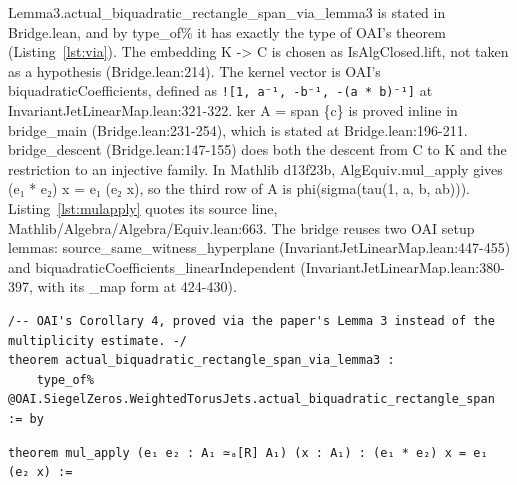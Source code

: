 Lemma3.actual\_biquadratic\_rectangle\_span\_via\_lemma3 is stated in Bridge.lean, and by type\_of\% it has exactly the type of OAI's theorem (Listing~\ref{lst:via}). %
The embedding K -> C is chosen as IsAlgClosed.lift, not taken as a hypothesis (Bridge.lean:214). %
The kernel vector is OAI's biquadraticCoefficients, defined as \texttt{![1, a⁻¹, -b⁻¹, -(a * b)⁻¹]} at InvariantJetLinearMap.lean:321-322. %
ker A = span \{c\} is proved inline in bridge\_main (Bridge.lean:231-254), which is stated at Bridge.lean:196-211. %
bridge\_descent (Bridge.lean:147-155) does both the descent from C to K and the restriction to an injective family. %
In Mathlib d13f23b, AlgEquiv.mul\_apply gives (e₁ * e₂) x = e₁ (e₂ x), so the third row of A is phi(sigma(tau(1, a, b, ab))). %
Listing~\ref{lst:mulapply} quotes its source line, Mathlib/Algebra/Algebra/Equiv.lean:663. %
The bridge reuses two OAI setup lemmas: source\_same\_witness\_hyperplane (InvariantJetLinearMap.lean:447-455) and biquadraticCoefficients\_linearIndependent (InvariantJetLinearMap.lean:380-397, with its \_map form at 424-430). %

\begin{listing}[tbp]
\caption{The bridge theorem, lean-checks/\allowbreak comparator-copy/\allowbreak PaperLemma3/\allowbreak Bridge.lean:288-290.}\label{lst:via} %
\begin{Verbatim}
/-- OAI's Corollary 4, proved via the paper's Lemma 3 instead of the multiplicity estimate. -/
theorem actual_biquadratic_rectangle_span_via_lemma3 :
    type_of% @OAI.SiegelZeros.WeightedTorusJets.actual_biquadratic_rectangle_span := by
\end{Verbatim}
\end{listing}

\begin{listing}[tbp]
\caption{AlgEquiv.mul\_apply, Mathlib d13f23b Mathlib/\allowbreak Algebra/\allowbreak Algebra/\allowbreak Equiv.lean:663, as copied in results/2026-10-26-claims-ledger/mathlib-algequiv-mul\_apply.txt.}\label{lst:mulapply} %
\begin{Verbatim}
theorem mul_apply (e₁ e₂ : A₁ ≃ₐ[R] A₁) (x : A₁) : (e₁ * e₂) x = e₁ (e₂ x) :=
\end{Verbatim}
\end{listing}

